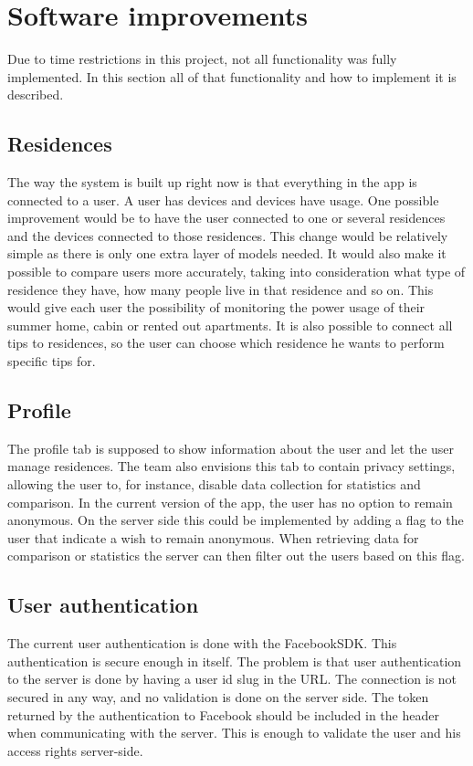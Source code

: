 \section{Software improvements}
Due to time restrictions in this project, not all functionality was fully implemented. In this section all of that functionality and how to implement it is described. 

\subsection{Residences}
The way the system is built up right now is that everything in the app is connected to a user. A user has devices and devices have usage. One possible improvement would be to have the user connected to one or several residences and the devices connected to those residences. This change would be relatively simple as there is only one extra layer of models needed. It would also make it possible to compare users more accurately, taking into consideration what type of residence they have, how many people live in that residence and so on. This would give each user the possibility of monitoring the power usage of their summer home, cabin or rented out apartments. It is also possible to connect all tips to residences, so the user can choose which residence he wants to perform specific tips for. 

\subsection{Profile}
The profile tab is supposed to show information about the user and let the user manage residences. The team also envisions this tab to contain privacy settings, allowing the user to, for instance, disable data collection for statistics and comparison. In the current version of the app, the user has no option to remain anonymous. 
On the server side this could be implemented by adding a flag to the user that indicate a wish to remain anonymous. When retrieving data for comparison or statistics the server can then filter out the users based on this flag.

\subsection{User authentication}
The current user authentication is done with the FacebookSDK. This authentication is secure enough in itself. 
The problem is that user authentication to the server is done by having a user id \gls{slug} in the URL. The connection is not secured in any way, and no validation is done on the server side.
The token returned by the authentication to Facebook should be included in the header when communicating with the server. This is enough to validate the user and his access rights server-side.

